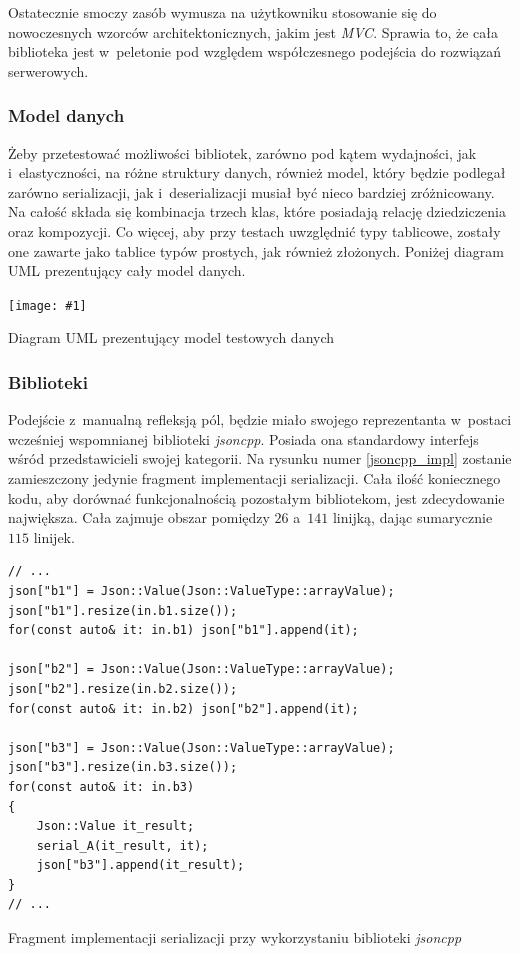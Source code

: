 \documentclass[12pt]{article}
\newcommand{\n}{\newline}
\newcommand{\putfig}[3]{
\begin{captioned}[H]
	\centering
	\texttt{[image: \#1]}
	\caption{#2}
	\label{#3}
	\medskip
\end{captioned}
}
\newcommand{\nonpl}[1]{{\it #1}}
\begin{document}
{{{				Ostatecznie smoczy zasób wymusza na użytkowniku stosowanie się do nowoczesnych wzorców architektonicznych, jakim jest \nonpl{MVC}\cite{mvc}.
				Sprawia to, że cała biblioteka jest w~peletonie pod względem współczesnego podejścia do rozwiązań serwerowych.
			}

			{
				\subsubsection{Model danych}

				Żeby przetestować możliwości bibliotek, zarówno pod kątem wydajności, jak i~elastyczności, na różne struktury danych,
				również model, który będzie podlegał zarówno serializacji, jak i~deserializacji musiał być nieco bardziej zróżnicowany.
				Na całość składa się kombinacja trzech klas, które posiadają relację dziedziczenia oraz kompozycji. Co więcej, aby przy
				testach uwzględnić typy tablicowe, zostały one zawarte jako tablice typów prostych, jak również złożonych. Poniżej
				diagram UML prezentujący cały model danych.

				\putfig{./img/benchmark_model_uml_diagram.png}{Diagram UML prezentujący model testowych danych}{uml_diagram}
			}

			{
				\subsubsection{Biblioteki}

				Podejście z~manualną refleksją pól, będzie miało swojego reprezentanta w~postaci wcześniej wspomnianej biblioteki \nonpl{jsoncpp}.
				Posiada ona standardowy interfejs wśród przedstawicieli swojej kategorii. Na rysunku numer \ref{jsoncpp_impl} zostanie zamieszczony jedynie fragment
				implementacji serializacji. Cała ilość koniecznego kodu, aby dorównać funkcjonalnością pozostałym bibliotekom, jest zdecydowanie
				największa. Cała zajmuje obszar pomiędzy $26$ a~$141$ linijką, dając sumarycznie $115$ linijek.\n

				\begin{captioned}[H]
					\begin{lstlisting}[frame=single]
// ...
json["b1"] = Json::Value(Json::ValueType::arrayValue);
json["b1"].resize(in.b1.size());
for(const auto& it: in.b1) json["b1"].append(it);

json["b2"] = Json::Value(Json::ValueType::arrayValue);
json["b2"].resize(in.b2.size());
for(const auto& it: in.b2) json["b2"].append(it);

json["b3"] = Json::Value(Json::ValueType::arrayValue);
json["b3"].resize(in.b3.size());
for(const auto& it: in.b3)
{
	Json::Value it_result;
	serial_A(it_result, it);
	json["b3"].append(it_result);
}
// ...
					\end{lstlisting}
					\caption{ Fragment implementacji serializacji przy wykorzystaniu biblioteki \nonpl{jsoncpp}}
					\label{jsoncpp_impl}
				\end{captioned}

}}}
\end{document}
